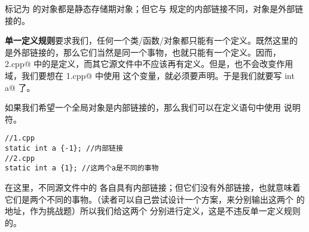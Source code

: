 标记为 \lstinline@extern@ 的对象都是静态存储期对象；但它与 \lstinline@static@ 规定的内部链接不同，\lstinline@extern@ 对象是外部链接的。\par
\textbf{单一定义规则}要求我们，任何一个类/函数/对象都只能有一个定义。既然这里的 \lstinline@a@ 是外部链接的，那么它们当然是同一个事物，也就只能有一个定义。因而，\lstinline@2.cpp@ 中的是定义，而其它源文件中不应该再有定义。但是，\lstinline@extern@ 也不会改变作用域，我们要想在 \lstinline@1.cpp@ 中使用 \lstinline@a@ 这个变量，就必须要声明。于是我们就要写 \lstinline@extern int a@ 了。\par
如果我们希望一个全局对象是内部链接的，那么我们可以在定义语句中使用 \lstinline@static@ 说明符。
\begin{lstlisting}
//1.cpp
static int a {-1}; //内部链接
//2.cpp
static int a {1}; //这两个a是不同的事物
\end{lstlisting}
在这里，不同源文件中的 \lstinline@a@ 各自具有内部链接；但它们没有外部链接，也就意味着它们是两个不同的事物。（读者可以自己尝试设计一个方案，来分别输出这两个 \lstinline@a@ 的地址，作为挑战题）所以我们给这两个 \lstinline@a@ 分别进行定义，这是不违反单一定义规则的。\par
